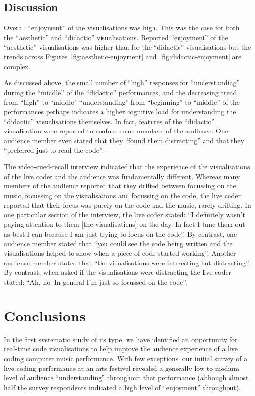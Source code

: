 \documentclass{sig-alternate}
\begin{document}
\subsection{Discussion}

Overall ``enjoyment'' of the visualisations was high. This was the
case for both the ``aesthetic'' and ``didactic'' visualisations.
Reported ``enjoyment'' of the ``aesthetic'' visualisations was higher
than for the ``didactic'' visualisations but the trends across
Figures~\ref{fig:aesthetic-enjoyment} and~\ref{fig:didactic-enjoyment}
are complex.

As discussed above, the small number of ``high'' responses for
``understanding'' during the ``middle'' of the ``didactic''
performances, and the decreasing trend from ``high'' to ``middle''
``understanding'' from ``beginning'' to ``middle'' of the performances
perhaps indicates a higher cognitive load for understanding the
``didactic'' visualisations themselves. In fact, features of the
``didactic'' visualisation were reported to confuse some members of
the audience. One audience member even stated that they ``found them
distracting'' and that they ``preferred just to read the code''.

The video-cued-recall interview indicated that the experience of the
visualisations of the live coder and the audience was fundamentally
different. Whereas many members of the audience reported that they
drifted between focussing on the music, focussing on the
visualisations and focussing on the code, the live coder reported that
their focus was purely on the code and the music, rarely drifting. In
one particular section of the interview, the live coder stated: ``I
definitely wasn't paying attention to them [the visualisations] on the
day. In fact I tune them out as best I can because I am just trying to
focus on the code''. By contrast, one audience member stated that
``you could see the code being written and the visualisations helped
to show when a piece of code started working''. Another audience
member stated that ``the visualisations were interesting but
distracting''. By contrast, when asked if the visualisations were
distracting the live coder stated: ``Ah, no. In general I'm just so
focussed on the code''.

\section{Conclusions}

In the first systematic study of its type, we have identified an
opportunity for real-time code visualisations to help improve the
audience experience of a live coding computer music performance. With
few exceptions, our initial survey of a live coding performance at an
arts festival revealed a generally low to medium level of audience
``understanding'' throughout that performance (although almost half
the survey respondents indicated a high level of ``enjoyment''
throughout).
\end{document}
